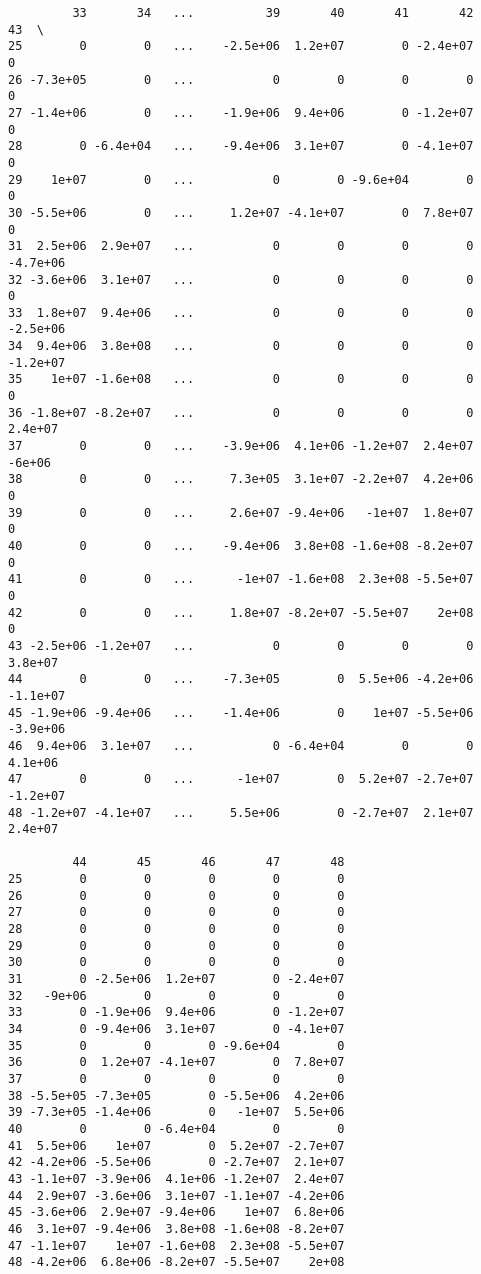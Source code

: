 \documentclass{article}
\begin{document}
\begin{verbatim}
         33       34   ...          39       40       41       42       43  \
25        0        0   ...    -2.5e+06  1.2e+07        0 -2.4e+07        0   
26 -7.3e+05        0   ...           0        0        0        0        0   
27 -1.4e+06        0   ...    -1.9e+06  9.4e+06        0 -1.2e+07        0   
28        0 -6.4e+04   ...    -9.4e+06  3.1e+07        0 -4.1e+07        0   
29    1e+07        0   ...           0        0 -9.6e+04        0        0   
30 -5.5e+06        0   ...     1.2e+07 -4.1e+07        0  7.8e+07        0   
31  2.5e+06  2.9e+07   ...           0        0        0        0 -4.7e+06   
32 -3.6e+06  3.1e+07   ...           0        0        0        0        0   
33  1.8e+07  9.4e+06   ...           0        0        0        0 -2.5e+06   
34  9.4e+06  3.8e+08   ...           0        0        0        0 -1.2e+07   
35    1e+07 -1.6e+08   ...           0        0        0        0        0   
36 -1.8e+07 -8.2e+07   ...           0        0        0        0  2.4e+07   
37        0        0   ...    -3.9e+06  4.1e+06 -1.2e+07  2.4e+07   -6e+06   
38        0        0   ...     7.3e+05  3.1e+07 -2.2e+07  4.2e+06        0   
39        0        0   ...     2.6e+07 -9.4e+06   -1e+07  1.8e+07        0   
40        0        0   ...    -9.4e+06  3.8e+08 -1.6e+08 -8.2e+07        0   
41        0        0   ...      -1e+07 -1.6e+08  2.3e+08 -5.5e+07        0   
42        0        0   ...     1.8e+07 -8.2e+07 -5.5e+07    2e+08        0   
43 -2.5e+06 -1.2e+07   ...           0        0        0        0  3.8e+07   
44        0        0   ...    -7.3e+05        0  5.5e+06 -4.2e+06 -1.1e+07   
45 -1.9e+06 -9.4e+06   ...    -1.4e+06        0    1e+07 -5.5e+06 -3.9e+06   
46  9.4e+06  3.1e+07   ...           0 -6.4e+04        0        0  4.1e+06   
47        0        0   ...      -1e+07        0  5.2e+07 -2.7e+07 -1.2e+07   
48 -1.2e+07 -4.1e+07   ...     5.5e+06        0 -2.7e+07  2.1e+07  2.4e+07   

         44       45       46       47       48  
25        0        0        0        0        0  
26        0        0        0        0        0  
27        0        0        0        0        0  
28        0        0        0        0        0  
29        0        0        0        0        0  
30        0        0        0        0        0  
31        0 -2.5e+06  1.2e+07        0 -2.4e+07  
32   -9e+06        0        0        0        0  
33        0 -1.9e+06  9.4e+06        0 -1.2e+07  
34        0 -9.4e+06  3.1e+07        0 -4.1e+07  
35        0        0        0 -9.6e+04        0  
36        0  1.2e+07 -4.1e+07        0  7.8e+07  
37        0        0        0        0        0  
38 -5.5e+05 -7.3e+05        0 -5.5e+06  4.2e+06  
39 -7.3e+05 -1.4e+06        0   -1e+07  5.5e+06  
40        0        0 -6.4e+04        0        0  
41  5.5e+06    1e+07        0  5.2e+07 -2.7e+07  
42 -4.2e+06 -5.5e+06        0 -2.7e+07  2.1e+07  
43 -1.1e+07 -3.9e+06  4.1e+06 -1.2e+07  2.4e+07  
44  2.9e+07 -3.6e+06  3.1e+07 -1.1e+07 -4.2e+06  
45 -3.6e+06  2.9e+07 -9.4e+06    1e+07  6.8e+06  
46  3.1e+07 -9.4e+06  3.8e+08 -1.6e+08 -8.2e+07  
47 -1.1e+07    1e+07 -1.6e+08  2.3e+08 -5.5e+07  
48 -4.2e+06  6.8e+06 -8.2e+07 -5.5e+07    2e+08  


\end{verbatim}
\end{document}
